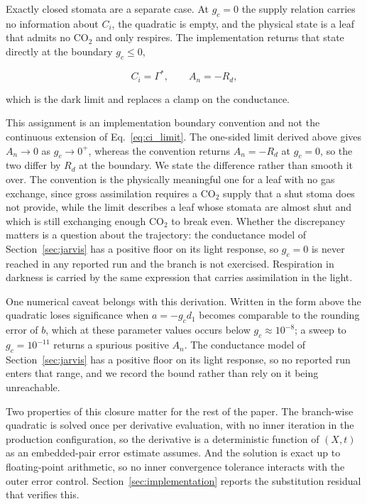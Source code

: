 Exactly closed stomata are a separate case. At $g_c = 0$ the supply relation
carries no information about $C_i$, the quadratic is empty, and the physical
state is a leaf that admits no CO$_2$ and only respires. The implementation
returns that state directly at the boundary $g_c \leq 0$,

\begin{equation}
C_i = \Gamma^{*}, \qquad A_n = -R_d ,
\label{eq:ci_dark}
\end{equation}

which is the dark limit and replaces a clamp on the conductance.

This assignment is an implementation boundary convention and not the continuous
extension of Eq.~\eqref{eq:ci_limit}. The one-sided limit derived above gives
$A_n \to 0$ as $g_c \to 0^{+}$, whereas the convention returns $A_n = -R_d$ at
$g_c = 0$, so the two differ by $R_d$ at the boundary. We state the difference
rather than smooth it over. The convention is the physically meaningful one for a
leaf with no gas exchange, since gross assimilation requires a CO$_2$ supply that
a shut stoma does not provide, while the limit describes a leaf whose stomata are
almost shut and which is still exchanging enough CO$_2$ to break even. Whether
the discrepancy matters is a question about the trajectory: the conductance model
of Section~\ref{sec:jarvis} has a positive floor on its light response, so
$g_c = 0$ is never reached in any reported run and the branch is not exercised.
Respiration in darkness is carried by the same expression that carries
assimilation in the light.

One numerical caveat belongs with this derivation. Written in the form above the
quadratic loses significance when $a = -g_c d_1$ becomes comparable to the
rounding error of $b$, which at these parameter values occurs below
$g_c \approx 10^{-8}$; a sweep to $g_c = 10^{-11}$ returns a spurious positive
$A_n$. The conductance model of Section~\ref{sec:jarvis} has a positive floor on
its light response, so no reported run enters that range, and we record the
bound rather than rely on it being unreachable.

Two properties of this closure matter for the rest of the paper. The branch-wise
quadratic is solved once per derivative evaluation, with no inner iteration in the
production configuration, so the derivative is a deterministic function of $(X,t)$
as an embedded-pair error estimate assumes. And the solution is exact up to
floating-point arithmetic, so no inner convergence tolerance interacts with the
outer error control. Section~\ref{sec:implementation} reports the substitution
residual that verifies this.

